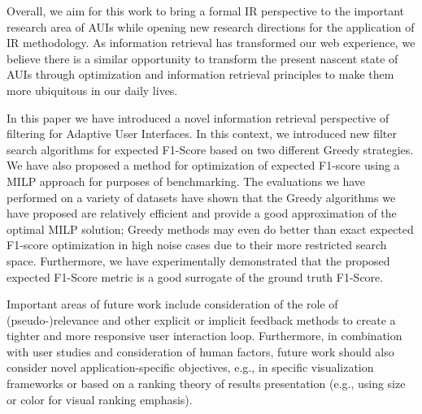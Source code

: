 Overall, we aim for this work to bring a formal IR perspective to the important research area of AUIs while opening new research directions for the application of IR methodology.  As information
retrieval has transformed our web experience, we believe there is
a similar opportunity to transform the present nascent state of AUIs
through optimization and information retrieval principles to make
them more ubiquitous in our daily lives. 

In this paper we have introduced a novel information retrieval perspective of filtering for Adaptive User Interfaces.  In this context, we introduced new filter search algorithms for expected F1-Score based on two different Greedy strategies.  We have also proposed a method for optimization of expected F1-score using a MILP approach for purposes of benchmarking. The evaluations we have performed on a variety of datasets have shown that the Greedy algorithms we have proposed are relatively efficient and provide a good approximation of the optimal MILP solution; Greedy methods may even do better than exact expected F1-score optimization in high noise cases due to their more restricted search space.  Furthermore, we have experimentally demonstrated that the proposed expected F1-Score metric is a good surrogate of the ground truth F1-Score.

Important areas of future work include consideration of the role of (pseudo-)relevance and other explicit or implicit feedback methods to create a tighter and more responsive user interaction loop.
Furthermore, in combination with user studies and consideration of human factors, future work should also consider novel application-specific objectives, e.g.,  in specific visualization frameworks or based on a ranking theory of results presentation (e.g., using size or color for visual ranking emphasis).  


